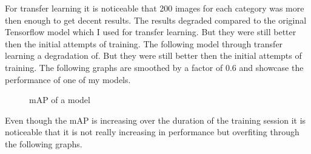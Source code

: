 \newpage \noindent
For transfer learning it is noticeable that 200 images for each category was more then enough to get decent results. The results degraded compared
to the original Tensorflow model which I used for transfer learning. But they were still better then the initial attempts of training. The following
model through transfer learning a degradation of. But they were still better then the initial attempts of training. The following
graphs are smoothed by a factor of 0.6 and showcase the performance of one of my models.
\vspace{0.25cm}
\begin{figure}[H]
    \begin{center}
        \caption{mAP of a model}
    \end{center}
\end{figure}
\newpage \noindent
Even though the mAP is increasing over the duration of the training session it is noticeable that it is not really increasing in performance but
overfiting through the following graphs.
\vspace{0.25cm}
